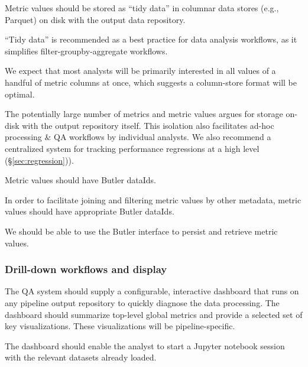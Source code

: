 \begin{recommendation}
Metric values should be stored as ``tidy data'' in columnar data stores (e.g., Parquet) on disk with the output data repository.
\end{recommendation}

``Tidy data'' \citep{JSSv059i10} is recommended as a best practice for data analysis workflows, as it simplifies filter-groupby-aggregate workflows.

We expect that most analysts will be primarily interested in all values of a handful of metric columns at once, which suggests a column-store format will be optimal.

The potentially large number of metrics and metric values argues for storage on-disk with the output repository itself.
This isolation also facilitates ad-hoc processing \& QA workflows by individual analysts.
We also recommend a centralized system for tracking performance regressions at a high level (\S \ref{sec:regression})).

\begin{recommendation}
Metric values should have Butler dataIds.
\end{recommendation}

In order to facilitate joining and filtering metric values by other metadata, metric values should have appropriate Butler dataIds.

\begin{recommendation}
We should be able to use the Butler interface to persist and retrieve metric values.
\end{recommendation}

\subsubsection{Drill-down workflows and display} \label{sec:metric_displays}

\begin{recommendation}
The QA system should supply a configurable, interactive dashboard that runs on any pipeline output repository to quickly diagnose the data processing.
The dashboard should summarize top-level global metrics and provide a selected set of key visualizations.
These visualizations will be pipeline-specific.
\end{recommendation}

\begin{recommendation}
The dashboard should enable the analyst to start a Jupyter notebook session with the relevant datasets already loaded.
\end{recommendation}

